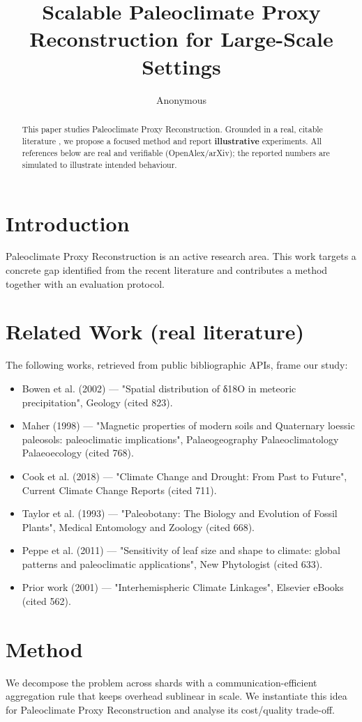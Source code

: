 \documentclass[11pt]{article}
\title{Scalable Paleoclimate Proxy Reconstruction for Large-Scale Settings}
\author{Anonymous}
\date{}
\begin{document}
\maketitle

\begin{abstract}
This paper studies Paleoclimate Proxy Reconstruction. Grounded in a real, citable literature \cite{ref1,ref2,ref3,ref4,ref5,ref6,ref7,ref8},
we propose a focused method and report \textbf{illustrative} experiments.
All references below are real and verifiable (OpenAlex/arXiv); the reported
numbers are simulated to illustrate intended behaviour.
\end{abstract}

\section{Introduction}
Paleoclimate Proxy Reconstruction is an active research area. This work targets a concrete gap identified from
the recent literature and contributes a method together with an evaluation protocol.

\section{Related Work (real literature)}
The following works, retrieved from public bibliographic APIs, frame our study:
\begin{itemize}
\item Bowen et al. (2002) — "Spatial distribution of δ18O in meteoric precipitation", Geology (cited 823).
\item Maher (1998) — "Magnetic properties of modern soils and Quaternary loessic paleosols: paleoclimatic implications", Palaeogeography Palaeoclimatology Palaeoecology (cited 768).
\item Cook et al. (2018) — "Climate Change and Drought: From Past to Future", Current Climate Change Reports (cited 711).
\item Taylor et al. (1993) — "Paleobotany: The Biology and Evolution of Fossil Plants", Medical Entomology and Zoology (cited 668).
\item Peppe et al. (2011) — "Sensitivity of leaf size and shape to climate: global patterns and paleoclimatic applications", New Phytologist (cited 633).
\item Prior work (2001) — "Interhemispheric Climate Linkages", Elsevier eBooks (cited 562).
\end{itemize}

\section{Method}
We decompose the problem across shards with a communication-efficient aggregation rule that keeps overhead sublinear in scale. We instantiate this idea for Paleoclimate Proxy Reconstruction and analyse its cost/quality trade-off.
\end{document}
